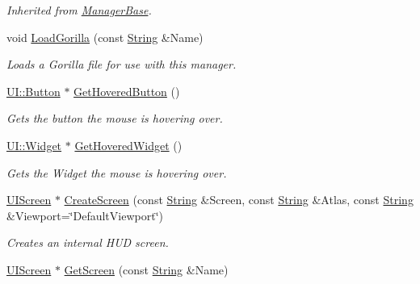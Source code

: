 \begin{DoxyCompactItemize}
\begin{DoxyCompactList}\small\item\em Inherited from \hyperlink{classphys_1_1ManagerBase}{ManagerBase}. \item\end{DoxyCompactList}\item 
void \hyperlink{classphys_1_1UIManager_afda4422105d6ab353fd40410adffbc0a}{LoadGorilla} (const \hyperlink{namespacephys_aa03900411993de7fbfec4789bc1d392e}{String} \&Name)
\begin{DoxyCompactList}\small\item\em Loads a Gorilla file for use with this manager. \item\end{DoxyCompactList}\item 
\hyperlink{classphys_1_1UI_1_1Button}{UI::Button} $\ast$ \hyperlink{classphys_1_1UIManager_acd08dba5be95182a6c923ed698822277}{GetHoveredButton} ()
\begin{DoxyCompactList}\small\item\em Gets the button the mouse is hovering over. \item\end{DoxyCompactList}\item 
\hyperlink{classphys_1_1UI_1_1Widget}{UI::Widget} $\ast$ \hyperlink{classphys_1_1UIManager_a5772b611b6881eb98932f4b400b44d09}{GetHoveredWidget} ()
\begin{DoxyCompactList}\small\item\em Gets the Widget the mouse is hovering over. \item\end{DoxyCompactList}\item 
\hyperlink{classphys_1_1UIScreen}{UIScreen} $\ast$ \hyperlink{classphys_1_1UIManager_a7cad638d86489e03fa2599185514b58c}{CreateScreen} (const \hyperlink{namespacephys_aa03900411993de7fbfec4789bc1d392e}{String} \&Screen, const \hyperlink{namespacephys_aa03900411993de7fbfec4789bc1d392e}{String} \&Atlas, const \hyperlink{namespacephys_aa03900411993de7fbfec4789bc1d392e}{String} \&Viewport=\char`\"{}DefaultViewport\char`\"{})
\begin{DoxyCompactList}\small\item\em Creates an internal HUD screen. \item\end{DoxyCompactList}\item 
\hyperlink{classphys_1_1UIScreen}{UIScreen} $\ast$ \hyperlink{classphys_1_1UIManager_a8cd693c7ec9c458fcc4169eea0d7b4db}{GetScreen} (const \hyperlink{namespacephys_aa03900411993de7fbfec4789bc1d392e}{String} \&Name)

\end{DoxyCompactItemize}
